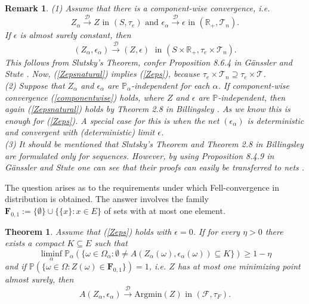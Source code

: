 \documentclass[sn-mathphys,Numbered]{sn-jnl}%
\theoremstyle{thmstyleone}%
\newtheorem{theorem}{Theorem}%
\theoremstyle{thmstyletwo}%
\newtheorem{remark}{Remark}%
\theoremstyle{thmstylethree}%
\begin{document}
\begin{remark} \label{suffcond} (1) Assume that there is a component-wise convergence, i.e.
\begin{equation} \label{componentwise}
Z_\alpha \stackrel{\mathcal{D}}{\rightarrow} Z \text{ in }  (S,\tau_e) \text{ and }
\epsilon_\alpha \stackrel{\mathcal{D}}{\rightarrow} \epsilon \text{ in } (\mathbb{R}_+,\mathcal{T}_n).
\end{equation}
If $\epsilon$ is almost surely constant, then
\begin{equation} \label{Zepsnatural}
 (Z_\alpha,\epsilon_\alpha) \stackrel{\mathcal{D}}{\rightarrow} (Z,\epsilon) \; \text{ in } (S \times \mathbb{R}_+,\tau_e \times \mathcal{T}_n).
\end{equation}
This follows from Slutsky's Theorem, confer Proposition 8.6.4 in G\"{a}nssler and Stute \cite{Stute}. Now, (\ref{Zepsnatural}) implies (\ref{Zeps}), because $\tau_e \times \mathcal{T}_n \supseteq \tau_e \times \mathcal{T}$.\\

(2) Suppose  that $Z_\alpha$ and $\epsilon_\alpha$ are $\mathbb{P}_\alpha$-independent for each $\alpha$. If component-wise convergence (\ref{componentwise}) holds, where $Z$ and $\epsilon$ are $\mathbb{P}$-independent,
then again (\ref{Zepsnatural}) holds by Theorem 2.8 in Billingsley \cite{Bill}. As we know this is enough for (\ref{Zeps}). A special case for this is when the net $(\epsilon_\alpha)$ is deterministic and convergent with (deterministic) limit $\epsilon$.\\

(3) It should be mentioned that Slutsky's Theorem and Theorem 2.8 in Billingsley \cite{Bill} are formulated only for sequences. However, by using Proposition 8.4.9 in G\"{a}nssler and Stute \cite{Stute} one can see that their proofs can easily be transferred to nets .
\end{remark}

\vspace{0.5cm}
The question arises as to the requirements under which Fell-convergence in distribution is obtained.
The answer involves the family $\textbf{F}_{0,1}:=\{\emptyset\} \cup \{\{x\}: x \in E\}$ of sets with at most one element.\\

\begin{theorem} \label{Fellconvergencein distribution} Assume that (\ref{Zeps}) holds with $\epsilon=0$.
If for every $\eta>0$ there exists a compact $K \subseteq E$ such that
$$
 \liminf_\alpha \mathbb{P}_\alpha(\{\omega \in \Omega_\alpha: \emptyset \neq A(Z_\alpha(\omega),\epsilon_\alpha(\omega)) \subseteq K\}) \ge 1-\eta
$$
and if $\mathbb{P}(\{\omega \in \Omega: Z(\omega) \in \textbf{F}_{0,1}\})=1$, i.e. $Z$ has at most one minimizing point almost surely, then $$A(Z_\alpha,\epsilon_\alpha) \stackrel{\mathcal{D}}{\rightarrow} \text{Argmin}(Z) \text{ in } (\mathcal{F}, \tau_{F}).$$
\end{theorem}
\end{document}
